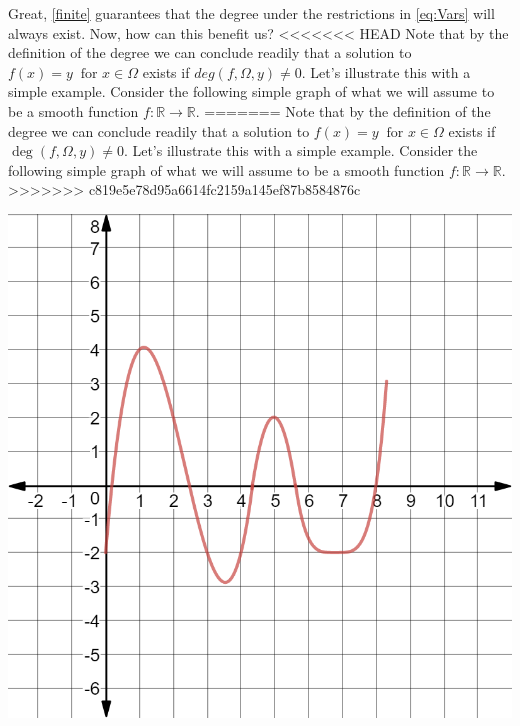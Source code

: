 \documentclass[11pt]{article}
\theoremstyle{plain}
\theoremstyle{definition}
\theoremstyle{remark}
\begin{document}
Great, \cref{finite} guarantees that the degree under the restrictions in \eqref{eq:Vars} will always exist. Now, how can this benefit us?
<<<<<<< HEAD
Note that by the definition of the degree we can conclude readily that a solution to $f(x)=y \ \text{ for } x\in\Omega$ exists if $deg\left(f,\Omega,y\right)\neq 0$. Let's illustrate this with a simple example. Consider the following simple graph of what we will assume to be a smooth function $f:\mathbb{R}\rightarrow\mathbb{R}$.
=======
Note that by the definition of the degree we can conclude readily that a solution to $f(x)=y \ \text{ for } x\in\Omega$ exists if $\operatorname{deg}\left(f,\Omega,y\right)\neq 0$. Let's illustrate this with a simple example. Consider the following simple graph of what we will assume to be a smooth function $f:\mathbb{R}\rightarrow\mathbb{R}$. 
>>>>>>> c819e5e78d95a6614fc2159a145ef87b8584876c
\begin{center}
\includegraphics[scale=0.25]{Figures/Curve1}
\end{center}
\end{document}

